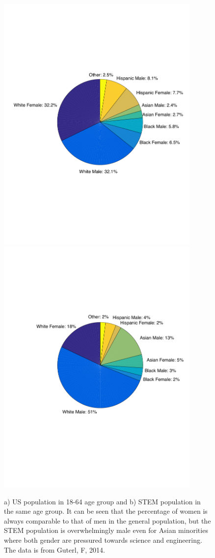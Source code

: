 \documentclass[utf8]{frontiersSCNS} %
\begin{document}
\begin{figure}%
  \centering
  \includegraphics[width=10cm]{PopulationPieChart.pdf}
  \includegraphics[width=10cm]{PieChartSTEM.pdf}
  \caption{a) US population in 18-64 age group and b) STEM population in the same age group. It can be seen that the percentage of women is always comparable to that of men in the general population, but the STEM population is overwhelmingly male even for Asian minorities where both gender are pressured towards science and engineering. The data is from Guterl, F, 2014.}
\label{fig:pie}
\end{figure}
\end{document}
